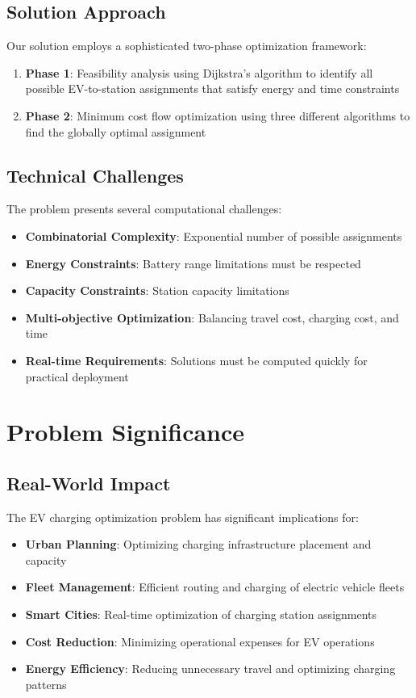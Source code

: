 \documentclass[12pt,a4paper]{article}
\begin{document}
\subsection{Solution Approach}

Our solution employs a sophisticated two-phase optimization framework:
\begin{enumerate}
    \item \textbf{Phase 1}: Feasibility analysis using Dijkstra's algorithm to identify all possible EV-to-station assignments that satisfy energy and time constraints
    \item \textbf{Phase 2}: Minimum cost flow optimization using three different algorithms to find the globally optimal assignment
\end{enumerate}

\subsection{Technical Challenges}

The problem presents several computational challenges:
\begin{itemize}
    \item \textbf{Combinatorial Complexity}: Exponential number of possible assignments
    \item \textbf{Energy Constraints}: Battery range limitations must be respected
    \item \textbf{Capacity Constraints}: Station capacity limitations
    \item \textbf{Multi-objective Optimization}: Balancing travel cost, charging cost, and time
    \item \textbf{Real-time Requirements}: Solutions must be computed quickly for practical deployment
\end{itemize}

\section{Problem Significance}

\subsection{Real-World Impact}

The EV charging optimization problem has significant implications for:
\begin{itemize}
    \item \textbf{Urban Planning}: Optimizing charging infrastructure placement and capacity
    \item \textbf{Fleet Management}: Efficient routing and charging of electric vehicle fleets
    \item \textbf{Smart Cities}: Real-time optimization of charging station assignments
    \item \textbf{Cost Reduction}: Minimizing operational expenses for EV operations
    \item \textbf{Energy Efficiency}: Reducing unnecessary travel and optimizing charging patterns
\end{itemize}
\end{document}
